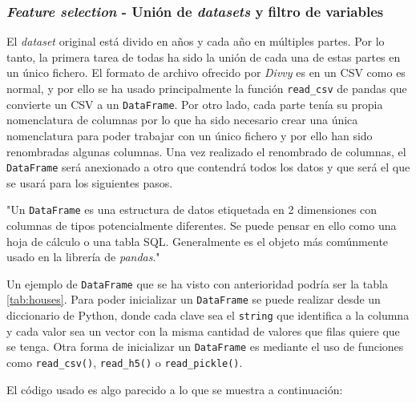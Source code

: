 \subsubsection{\textit{Feature selection} - Unión de \textit{datasets} y filtro de variables}\label{feature-selection}

El \textit{dataset} original \cite{divvy} está divido en años y cada año en múltiples partes. Por lo tanto, la primera tarea de todas ha sido la unión de cada una de estas partes en un único fichero. El formato de archivo ofrecido por \textit{Divvy} es en un CSV como es normal, y por ello se ha usado principalmente la función \verb|read_csv| de pandas que convierte un CSV a un \verb|DataFrame|. Por otro lado, cada parte tenía su propia nomenclatura de columnas por lo que ha sido necesario crear una única nomenclatura para poder trabajar con un único fichero y por ello han sido renombradas algunas columnas. Una vez realizado el renombrado de columnas, el \verb|DataFrame| será anexionado a otro que contendrá todos los datos y que será el que se usará para los siguientes pasos.

\begin{displayquote}
"Un \verb|DataFrame| es una estructura de datos etiquetada en 2 dimensiones con columnas de tipos potencialmente diferentes. Se puede pensar en ello como una hoja de cálculo o una tabla SQL. Generalmente es el objeto más comúnmente usado en la librería de \textit{pandas}." \cite{pandas}
\end{displayquote}

Un ejemplo de \verb|DataFrame| que se ha visto con anterioridad podría ser la tabla \ref{tab:houses}. Para poder inicializar un \verb|DataFrame| se puede realizar desde un diccionario de Python, donde cada clave sea el \verb|string| que identifica a la columna y cada valor sea un vector con la misma cantidad de valores que filas quiere que se tenga. Otra forma de inicializar un \verb|DataFrame| es mediante el uso de funciones como \verb|read_csv()|, \verb|read_h5()| o \verb|read_pickle()|.
\newline

El código usado es algo parecido a lo que se muestra a continuación:

